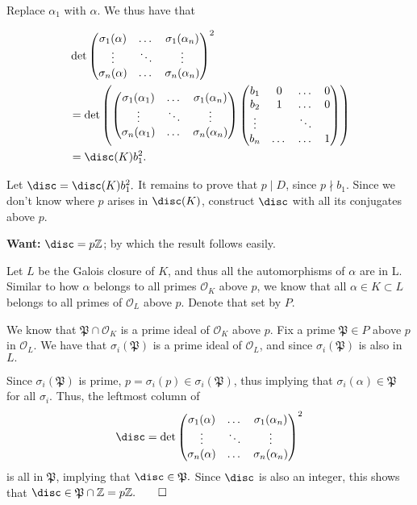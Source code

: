 \documentclass[a4paper, 12pt,oneside,openany]{book}
\begin{document}
Replace $\alpha_1$ with $\alpha.$ We thus have that 

\begin{align*}
    & \det \begin{pmatrix}
        \sigma_1(\alpha)& \dots & \sigma_1(\alpha_n) \\
        \vdots & \ddots & \vdots \\
        \sigma_n(\alpha) & \dots & \sigma_n(\alpha_n) \\
    \end{pmatrix}^2 \\
    &= \det \left(\begin{pmatrix}
        \sigma_1(\alpha_1)& \dots & \sigma_1(\alpha_n) \\
        \vdots & \ddots & \vdots \\
        \sigma_n(\alpha_1) & \dots & \sigma_n(\alpha_n) \\
    \end{pmatrix}
    \begin{pmatrix}
        b_1 & 0 & \dots & 0 \\
        b_2 & 1 & \dots & 0 \\
        \vdots & & \ddots & \\
        b_n & \dots & \dots & 1
    \end{pmatrix}
    \right) \\
    &= \disc(K) b_1^2.
\end{align*}

Let $\disc = \disc(K) b_1^2.$ It remains to prove that $p \mid D$, since $p \nmid b_1.$ Since we don't know where $p$ arises in $\disc(K)$, construct $\disc$ with all its conjugates above $p.$

\textbf{Want:} $\disc = p\mathbb{Z}$; by which the result follows easily. 

Let $L$ be the Galois closure of $K$, and thus all the automorphisms of $\alpha$ are in L. Similar to how $\alpha$ belongs to all primes $\mathcal{O}_K$ above $p$, we know that all $\alpha \in K \subset L$ belongs to all primes of $\mathcal{O}_L$ above $p.$ Denote that set by $P.$ 

We know that $\mathfrak{P} \cap \mathcal{O}_K$ is a prime ideal of $\mathcal{O}_K$ above $p.$ Fix a prime $\mathfrak{P} \in P$ above $p$ in $\mathcal{O}_L.$ We have that $\sigma_i(\mathfrak{P})$ is a prime ideal of $\mathcal{O}_L$, and since $\sigma_i(\mathfrak{P})$ is also in $L.$ 

Since $\sigma_i(\mathfrak{P})$ is prime, $p=\sigma_i(p) \in \sigma_i(\mathfrak{P})$, thus implying that $\sigma_i(\alpha) \in \mathfrak{P}$ for all $\sigma_i.$ Thus, the leftmost column of 
$$\disc = \det \begin{pmatrix}
        \sigma_1(\alpha)& \dots & \sigma_1(\alpha_n) \\
        \vdots & \ddots & \vdots \\
        \sigma_n(\alpha) & \dots & \sigma_n(\alpha_n) \\
\end{pmatrix}^2$$ is all in $\mathfrak{P}$, implying that $\disc \in \mathfrak{P}.$ Since $\disc$ is also an integer, this shows that $\disc \in \mathfrak{P} \cap \mathbb{Z} = p\mathbb{Z}. \qed$ 
\end{document}
